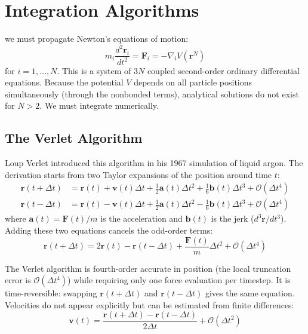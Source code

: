 \section{Integration Algorithms}
\label{sec:integrators}

 we must propagate Newton's equations of motion:
\begin{equation}
\label{eq:newton}
m_i \frac{d^2 \mathbf{r}_i}{dt^2} = \mathbf{F}_i = -\nabla_i V(\mathbf{r}^N)
\end{equation}
for $i = 1, \ldots, N$. This is a system of $3N$ coupled second-order ordinary differential equations. Because the potential $V$ depends on all particle positions simultaneously (through the nonbonded terms), analytical solutions do not exist for $N > 2$. We must integrate numerically.

\subsection{The Verlet Algorithm}
\label{sec:verlet}

Loup Verlet introduced this algorithm in his 1967 simulation of liquid argon. The derivation starts from two Taylor expansions of the position around time $t$:
\begin{align}
\label{eq:taylor-forward}
\mathbf{r}(t + \Delta t) &= \mathbf{r}(t) + \mathbf{v}(t)\Delta t + \frac{1}{2}\mathbf{a}(t)\Delta t^2 + \frac{1}{6}\mathbf{b}(t)\Delta t^3 + \mathcal{O}(\Delta t^4) \\[4pt]
\label{eq:taylor-backward}
\mathbf{r}(t - \Delta t) &= \mathbf{r}(t) - \mathbf{v}(t)\Delta t + \frac{1}{2}\mathbf{a}(t)\Delta t^2 - \frac{1}{6}\mathbf{b}(t)\Delta t^3 + \mathcal{O}(\Delta t^4)
\end{align}
where $\mathbf{a}(t) = \mathbf{F}(t)/m$ is the acceleration and $\mathbf{b}(t)$ is the jerk ($d^3\mathbf{r}/dt^3$). Adding these two equations cancels the odd-order terms:
\begin{equation}
\label{eq:verlet}
\mathbf{r}(t + \Delta t) = 2\mathbf{r}(t) - \mathbf{r}(t - \Delta t) + \frac{\mathbf{F}(t)}{m}\Delta t^2 + \mathcal{O}(\Delta t^4)
\end{equation}

The Verlet algorithm is fourth-order accurate in position (the local truncation error is $\mathcal{O}(\Delta t^4)$) while requiring only one force evaluation per timestep. It is time-reversible: swapping $\mathbf{r}(t+\Delta t)$ and $\mathbf{r}(t-\Delta t)$ gives the same equation. Velocities do not appear explicitly but can be estimated from finite differences:
\begin{equation}
\label{eq:verlet-velocity}
\mathbf{v}(t) = \frac{\mathbf{r}(t + \Delta t) - \mathbf{r}(t - \Delta t)}{2\Delta t} + \mathcal{O}(\Delta t^2)
\end{equation}

